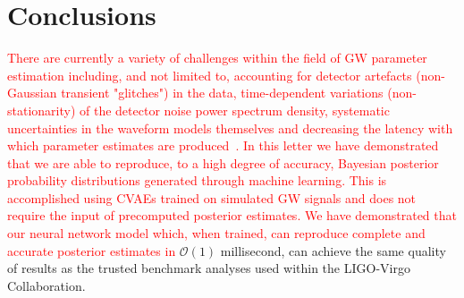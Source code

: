 %
%

%
%
%
\section{Conclusions}
\textcolor{red}{
There are currently a variety of challenges within the field of \ac{GW}
parameter estimation including, and not limited to, accounting for detector
artefacts (non-Gaussian transient "glitches") in the data, time-dependent
variations (non-stationarity) of the detector noise power spectrum density,
systematic uncertainties in the waveform models themselves and decreasing the
latency with which parameter estimates are produced~\cite{1409.7215}. In this
letter we have demonstrated that we are able to reproduce, to a high degree of
accuracy, Bayesian posterior probability distributions generated through
machine learning. This is accomplished using \acp{CVAE} trained on simulated
\ac{GW} signals and does not require the input of precomputed posterior
estimates. We have demonstrated that our neural network model which, when
trained, can reproduce complete and accurate posterior estimates in}
$\mathcal{O}(1)$ millisecond, can achieve the same quality of results as the
trusted benchmark analyses used within the LIGO-Virgo Collaboration.

